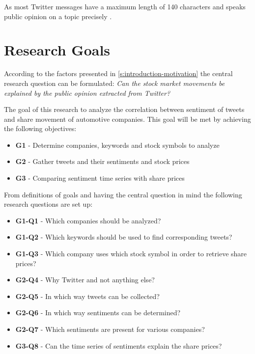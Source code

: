 As most Twitter messages have a maximum length of 140 characters and speaks public opinion on a topic precisely
\citep{Pagolu2016a}.


\section{Research Goals}
\label{s:introduction-researchgoals}

According to the factors presented in \cref{s:introduction-motivation} the central research question can be formulated:
\emph{Can the stock market movements be explained by the public opinion extracted from Twitter?}

The goal of this research to analyze the correlation between sentiment of tweets and share movement of automotive companies.
This goal will be met by achieving the following objectives:

\begin{itemize}
    \item \textbf{G1} - Determine companies, keywords and stock symbols to analyze
    \item \textbf{G2} - Gather tweets and their sentiments and stock prices
    \item \textbf{G3} - Comparing sentiment time series with share prices
\end{itemize}

From definitions of goals and having the central question in mind the following research questions are set up:

\begin{itemize}
    \item \textbf{G1-Q1} - Which companies should be analyzed?
    \item \textbf{G1-Q2} - Which keywords should be used to find corresponding tweets?
    \item \textbf{G1-Q3} - Which company uses which stock symbol in order to retrieve share prices?
    \item \textbf{G2-Q4} - Why Twitter and not anything else?
    \item \textbf{G2-Q5} - In which way tweets can be collected?
    \item \textbf{G2-Q6} - In which way sentiments can be determined?
    \item \textbf{G2-Q7} - Which sentiments are present for various companies?
	\item \textbf{G3-Q8} - Can the time series of sentiments explain the share prices?
\end{itemize}


